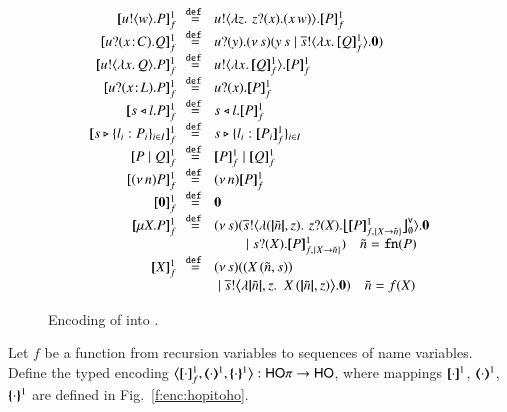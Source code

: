 \begin{figure}[t]
\[\begin{array}{l}
\begin{array}{rcll}
  \pmapp{\bout{u}{w} P}{1}{f}	&\!\!\defeq\!\!&	\bout{u}{ \abs{z}{\,\binp{z}{x} (\appl{x}{w})} } \pmapp{P}{1}{f} \\
  \pmapp{\binp{u}{\AT{x}{C}} Q}{1}{f}	&\!\!\defeq\!\!&	\binp{u}{y} \newsp{s}{\appl{y}{s} \Par \bout{\dual{s}}{\abs{x}{\pmapp{Q}{1}{f}}} \inact} \\
		\pmapp{\bout{u}{\abs{{x}}{Q}} P}{1}{f}  
&\!\!\defeq\!\!& \bout{u}{\abs{{x}}{\pmapp{Q}{1}{f}}} \pmapp{P}{1}{f} \\
		\pmapp{\binp{u}{\AT{x}{L}} P}{1}{f} &\!\!\defeq\!\!& \binp{u}{x} \pmapp{P}{1}{f}\\
		\pmapp{\bsel{s}{l} P}{1}{f} &\!\!\defeq\!\!& \bsel{s}{l} \pmapp{P}{1}{f}\\
		\pmapp{\bbra{s}{l_i: P_i}_{i \in I}}{1}{f} &\!\!\defeq\!\!& \bbra{s}{l_i: \pmapp{P_i}{1}{f}}_{i \in I}\\

		\pmapp{P \Par Q}{1}{f} &\!\!\defeq\!\!& \pmapp{P}{1}{f} \Par \pmapp{Q}{1}{f}\\
		\pmapp{\news{n} P}{1}{f} &\!\!\defeq\!\!& \news{n} \pmapp{P}{1}{f}\\
		\pmapp{\inact}{1}{f} &\!\!\defeq\!\!&\inact\\
		\pmapp{\recp{X}{P}}{1}{f} &\!\!\defeq\!\!&
		\newsp{s}{
\bout{\dual{s}}{\abs{(\vmap{\tilde{n}}, z)} \,{\binp{z}{\X} \auxmapp{\pmapp{P}{1}{{f,\{\rvar{X}\to \tilde{n}\}}}}{\mathsf{v}}{\es}}} \inact
\\ & & 
\quad\quad \Par 
\binp{s}{\X} \pmapp{P}{1}{{f,\{\rvar{X}\to \tilde{n}\}}}
} 
\quad \tilde{n} = \fn{P} \\ 
\pmapp{\rvar{X}}{1}{f} &\!\!\defeq\!\!& \newsp{s}{(\appl{X}{(\tilde{n}, s)})\\
& &  \Par \bbout{\dual{s}}{ \abs{\vmap{\tilde{n}},z}\,\,{\appl{X}{(\vmap{\tilde{n}}, z)}}} \inact}  \quad \tilde{n} = f(\rvar{X}) \\
	\end{array}
\end{array}
\]
\caption{\label{f:enc:fotohorec}
Encoding of \HOp into \HO.
}

\end{figure}

\begin{definition}
\label{d:enc:hopitoho}
Let $f$ be a function from recursion variables to sequences of name variables.
%
Define the typed encoding $\enco{\map{\cdot}^{1}_f, \mapt{\cdot}^{1}, \mapa{\cdot}^{1}}: \HOp \to \HO$,
where mappings $[\!\![\cdot]\!\!]^{1}$, $(\!\!\langle\cdot\rangle\!\!)^{1}$, $\{\!\!\{\cdot\}\!\!\}^{1}$
are defined in Fig.~\ref{f:enc:hopitoho}.
\end{definition}

